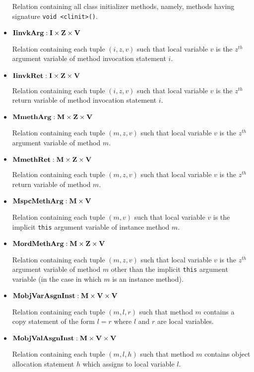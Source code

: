 \documentclass{article}
\providecommand\Mdom{{\bf M}}
\providecommand\Idom{{\bf I}}
\providecommand\Vdom{{\bf V}}
\providecommand\Zdom{{\bf Z}}
\providecommand\MmethArg{{\bf MmethArg}}
\providecommand\MmethRet{{\bf MmethRet}}
\providecommand\IinvkArg{{\bf IinvkArg}}
\providecommand\IinvkRet{{\bf IinvkRet}}
\providecommand\MordMethArg{{\bf MordMethArg}}
\providecommand\MspcMethArg{{\bf MspcMethArg}}
\providecommand\MobjVarAsgnInst{{\bf MobjVarAsgnInst}}
\providecommand\MobjValAsgnInst{{\bf MobjValAsgnInst}}
\begin{document}
\begin{itemize}
Relation containing all class initializer methods, namely,
methods having signature {\tt void <clinit>()}.

\item
$\IinvkArg : \Idom \times \Zdom \times \Vdom$

Relation containing each tuple $(i,z,v)$ such that local variable $v$
is the $z^{th}$ argument variable of method invocation statement $i$.

\item
$\IinvkRet : \Idom \times \Zdom \times \Vdom$

Relation containing each tuple $(i,z,v)$ such that local variable $v$
is the $z^{th}$ return variable of method invocation statement $i$.

\item
$\MmethArg : \Mdom \times \Zdom \times \Vdom$

Relation containing each tuple $(m,z,v)$ such that local variable
$v$ is the $z^{th}$ argument variable of method $m$.

\item
$\MmethRet : \Mdom \times \Zdom \times \Vdom$

Relation containing each tuple $(m,z,v)$ such that local variable
$v$ is the $z^{th}$ return variable of method $m$.

\item
$\MspcMethArg : \Mdom \times \Vdom$

Relation containing each tuple $(m,v)$ such that local variable $v$ is
the implicit {\tt this} argument variable of instance method $m$.

\item

$\MordMethArg : \Mdom \times \Zdom \times \Vdom$

Relation containing each tuple $(m,z,v)$ such that local variable $v$
is the $z^{th}$ argument variable of method $m$ other than the implicit
{\tt this} argument variable (in the case in which $m$ is an instance
method).

\item
$\MobjVarAsgnInst : \Mdom \times \Vdom \times \Vdom$

Relation containing each tuple $(m,l,r)$ such that method $m$
contains a copy statement of the form $l = r$ where $l$ and $r$ are
local variables.

\item
$\MobjValAsgnInst : \Mdom \times \Vdom \times \Vdom$

Relation containing each tuple $(m,l,h)$ such that method $m$ contains
object allocation statement $h$ which assigns to local variable $l$.


\end{itemize}
\end{document}

